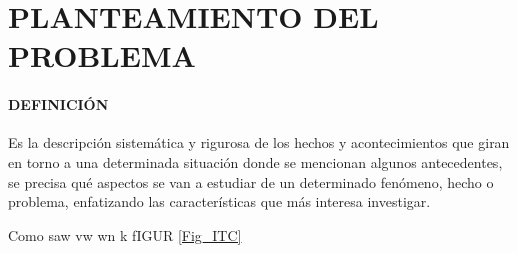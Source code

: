 \section{PLANTEAMIENTO DEL PROBLEMA}

\paragraph{DEFINICIÓN}
Es la descripción sistemática y rigurosa de los hechos y acontecimientos que giran en torno a una determinada situación donde se mencionan algunos antecedentes, se precisa qué aspectos se van a estudiar de un determinado fenómeno, hecho o problema, enfatizando las características que más interesa investigar.

Como saw vw wn k fIGUR \ref{Fig_ITC}